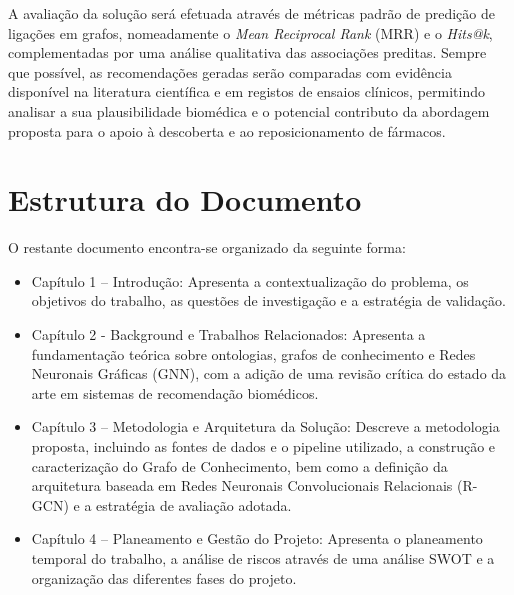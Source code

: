 A avaliação da solução será efetuada através de métricas padrão de predição de ligações em grafos, nomeadamente o \emph{Mean Reciprocal Rank} (MRR) e o \emph{Hits@k}, complementadas por uma análise qualitativa das associações preditas. Sempre que possível, as recomendações geradas serão comparadas com evidência disponível na literatura científica e em registos de ensaios clínicos, permitindo analisar a sua plausibilidade biomédica e o potencial contributo da abordagem proposta para o apoio à descoberta e ao reposicionamento de fármacos.

\section{Estrutura do Documento}
\label{sec:estrutura}
O restante documento encontra-se organizado da seguinte forma:
\begin{itemize}
    \item Capítulo 1 – Introdução: Apresenta a contextualização do problema, os objetivos do trabalho, as questões de investigação e a estratégia de validação.
    
    \item Capítulo 2 - Background e Trabalhos Relacionados: Apresenta a fundamentação teórica sobre ontologias, grafos de conhecimento e Redes Neuronais Gráficas (GNN), com a adição de uma revisão crítica do estado da arte em sistemas de recomendação biomédicos.

    \item Capítulo 3 – Metodologia e Arquitetura da Solução: Descreve a metodologia proposta, incluindo as fontes de dados e o pipeline utilizado, a construção e caracterização do Grafo de Conhecimento, bem como a definição da arquitetura baseada em Redes Neuronais Convolucionais Relacionais (R-GCN) e a estratégia de avaliação adotada.

    \item Capítulo 4 – Planeamento e Gestão do Projeto: Apresenta o planeamento temporal do trabalho, a análise de riscos através de uma análise SWOT e a organização das diferentes fases do projeto.
\end{itemize}